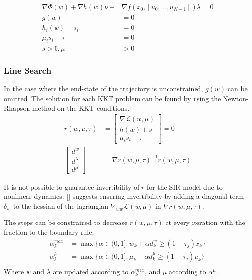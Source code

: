 \begin{align}
        \nabla \Phi(w) + \nabla h(w)\nu + &\nabla f(x_0, [u_0, \dots, u_{N-1}])\lambda = 0 \nonumber \\ 
        g(w) &= 0\nonumber \label{eq:KKT_approx_IPOPT}\\
    h_i(w) + s_i &= 0\\\nonumber
    \mu_is_i-\tau &= 0\\\nonumber
    s > 0, \mu &> 0
\end{align}

\subsubsection{Line Search}
In the case where the end-state of the trajectory is unconstrained, $g(w)$ can be omitted. The solution for each KKT problem can be found by using the Newton-Rhapson method on the KKT conditions. 
\begin{align}
    r(w, \mu, \tau) &= \begin{bmatrix}
    \nabla \mathcal{L}(w, \mu)\\
    h(w) + s\\
    \mu_is_i - \tau
    \end{bmatrix} = 0\\
    \begin{bmatrix}
    d^w\\d^\lambda\\d^\mu
    \end{bmatrix} &= \nabla r(w, \mu, \tau)^{-1} r(w, \mu, \tau)
\end{align}

It is not possible to guarantee invertibility of $r$ for the SIR-model due to nonlinear dynamics. [\cite{IPOPT_output_ref}] suggests ensuring invertibility by adding a diagonal term $\delta_w$ to the hessian of the lagrangian $\nabla_{ww}\mathcal{L}(w, \mu)$ in $\nabla r(w,\mu, \tau)$.

The steps can be constrained to decrease $r(w, \mu, \tau)$ at every iteration with the fraction-to-the-boundary rule:
\begin{align}
    \alpha_k^{max} &= \max \{\alpha \in (0,1]: w_k + \alpha d_k^w \geq (1-\tau_j)x_k\}\\
     \alpha_k^{\mu} &= \max \{\alpha \in (0,1]: \mu_k + \alpha d_k^\mu \geq (1-\tau_j)\mu_k\}\\
\end{align}
Where $w$ and $\lambda$ are updated according to $\alpha_k^{max}$, and $\mu$ according to $\alpha^\mu$.



